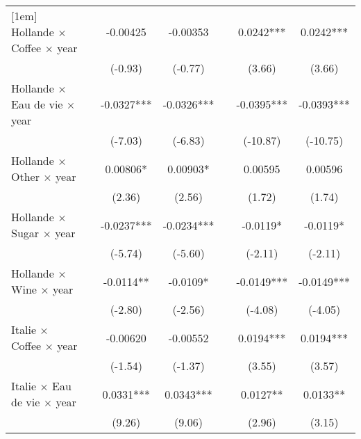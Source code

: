 {\begin{tabular}{l*{6}{c}}
[1em]
Hollande $\times$ Coffee $\times$ year&                     &    -0.00425         &    -0.00353         &                     &      0.0242***&      0.0242***\\
                    &                     &     (-0.93)         &     (-0.77)         &                     &      (3.66)         &      (3.66)         \\
[1em]
Hollande $\times$ Eau de vie $\times$ year&                     &     -0.0327***&     -0.0326***&                     &     -0.0395***&     -0.0393***\\
                    &                     &     (-7.03)         &     (-6.83)         &                     &    (-10.87)         &    (-10.75)         \\
[1em]
Hollande $\times$ Other $\times$ year&                     &     0.00806*  &     0.00903*  &                     &     0.00595         &     0.00596         \\
                    &                     &      (2.36)         &      (2.56)         &                     &      (1.72)         &      (1.74)         \\
[1em]
Hollande $\times$ Sugar $\times$ year&                     &     -0.0237***&     -0.0234***&                     &     -0.0119*  &     -0.0119*  \\
                    &                     &     (-5.74)         &     (-5.60)         &                     &     (-2.11)         &     (-2.11)         \\
[1em]
Hollande $\times$ Wine $\times$ year&                     &     -0.0114** &     -0.0109*  &                     &     -0.0149***&     -0.0149***\\
                    &                     &     (-2.80)         &     (-2.56)         &                     &     (-4.08)         &     (-4.05)         \\
[1em]
Italie $\times$ Coffee $\times$ year&                     &    -0.00620         &    -0.00552         &                     &      0.0194***&      0.0194***\\
                    &                     &     (-1.54)         &     (-1.37)         &                     &      (3.55)         &      (3.57)         \\
[1em]
Italie $\times$ Eau de vie $\times$ year&                     &      0.0331***&      0.0343***&                     &      0.0127** &      0.0133** \\
                    &                     &      (9.26)         &      (9.06)         &                     &      (2.96)         &      (3.15)         \\

\end{tabular}}
